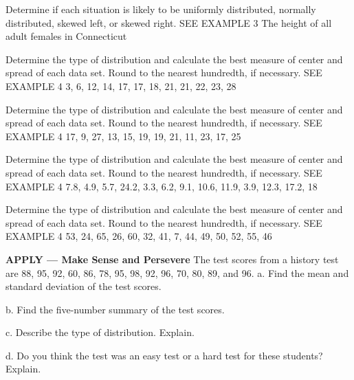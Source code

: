 \documentclass{article}
\newenvironment{practice}[2]{}{}        %
\newcommand{\answer}[1]{}               %
\begin{document}
\begin{practice}{21}{1}
Determine if each situation is likely to be uniformly distributed, normally distributed, skewed left, or skewed right. SEE EXAMPLE 3
The height of all adult females in Connecticut
\answer{normally distributed}
\end{practice}
\begin{practice}{22}{1}
Determine the type of distribution and calculate the best measure of center and spread of each data set. Round to the nearest hundredth, if necessary. SEE EXAMPLE 4
3, 6, 12, 14, 17, 17, 18, 21, 21, 22, 23, 28
\answer{skewed left; median = 17.5; interquartile range = 8.5}
\end{practice}
\begin{practice}{23}{1}
Determine the type of distribution and calculate the best measure of center and spread of each data set. Round to the nearest hundredth, if necessary. SEE EXAMPLE 4
17, 9, 27, 13, 15, 19, 19, 21, 11, 23, 17, 25
\answer{normal distribution; mean = 18; standard deviation = 5.3}
\end{practice}
\begin{practice}{24}{1}
Determine the type of distribution and calculate the best measure of center and spread of each data set. Round to the nearest hundredth, if necessary. SEE EXAMPLE 4
7.8, 4.9, 5.7, 24.2, 3.3, 6.2, 9.1, 10.6, 11.9, 3.9, 12.3, 17.2, 18
\answer{skewed right; median = 9.1; interquartile range = 9.45}
\end{practice}
\begin{practice}{25}{1}
Determine the type of distribution and calculate the best measure of center and spread of each data set. Round to the nearest hundredth, if necessary. SEE EXAMPLE 4
53, 24, 65, 26, 60, 32, 41, 7, 44, 49, 50, 52, 55, 46
\answer{skewed left; median = 47.5; interquartile range = 21}
\end{practice}
\begin{practice}{26}{2}
\textbf{APPLY — Make Sense and Persevere} The test scores from a history test are 88, 95, 92, 60, 86, 78, 95, 98, 92, 96, 70, 80, 89, and 96.
a. Find the mean and standard deviation of the test scores.
\answer{a. mean: 86.79; standard deviation: 10.74}
b. Find the five-number summary of the test scores.
\answer{b. minimum: 60; first quartile: 80; median: 90.5; third quartile: 95; and maximum: 98}
c. Describe the type of distribution. Explain.
\answer{c. Because there is a long tail of data to the left, the distribution is skewed left.}
d. Do you think the test was an easy test or a hard test for these students? Explain.
\answer{d. The test was an easy test because more students received higher scores, leading to a distribution that is skewed left.}
\end{practice}
\end{document}
